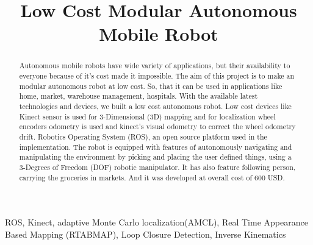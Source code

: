 \documentclass[conference]{IEEEtran}
\begin{document}
%
\title{Low Cost Modular Autonomous Mobile Robot}


\author{
\and
{}
}


\maketitle


\begin{IEEEkeywords} 
ROS, Kinect, adaptive Monte Carlo localization(AMCL), Real Time Appearance Based Mapping (RTABMAP), Loop Closure Detection, Inverse Kinematics
\end{IEEEkeywords}

\begin{abstract}
Autonomous mobile robots have wide variety of applications, but their availability to everyone because of it’s cost made it impossible. The aim of this project is to make an modular autonomous robot at low cost. So,  that it can be used in applications like home, market, warehouse management, hospitals. With the available latest technologies and devices, we built a low cost autonomous robot. Low cost devices like Kinect sensor is used for 3-Dimensional (3D) mapping and for localization wheel encoders odometry is used and kinect’s visual odometry to correct the wheel odometry drift. Robotics Operating System (ROS), an open source platform used in the implementation. The robot is equipped with features of autonomously navigating and manipulating the environment by picking and placing the user defined things, using a 3-Degrees of Freedom (DOF) robotic manipulator. It has also feature  following person, carrying the groceries in markets. And it was developed at overall cost of 600 USD.
\end{abstract}
\IEEEpeerreviewmaketitle
\end{document}
